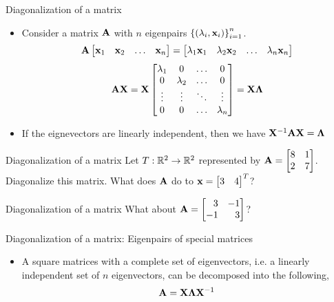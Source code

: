 \documentclass[aspectratio=169]{beamer}
\let\olditem\item
\renewcommand{\item}{\setlength{\itemsep}{\fill}\olditem}
\def\mf{\ensuremath\mathbf}
\def\mb{\ensuremath\mathbb}
\def\bmx{\ensuremath\begin{bmatrix*}[r]}
\def\emx{\ensuremath\end{bmatrix*}}
\begin{document}
\begin{frame}[t]{Diagonalization of a matrix}
\begin{itemize}
    \item Consider a matrix $\mf{A}$ with $n$ eigenpairs $\left\{\left(\lambda_i, \mf{x}_i\right)\right\}_{i=1}^n$.
    \[ \mf{A}\begin{bmatrix*}\mf{x}_1 & \mf{x}_2 & \ldots & \mf{x}_n\end{bmatrix*} = \begin{bmatrix*}\lambda_1\mf{x}_1 & \lambda_2\mf{x}_2 & \ldots & \lambda_n\mf{x}_n\end{bmatrix*} \]
    \[ \mf{AX} = \mf{X}\begin{bmatrix*}\lambda_1 & 0 & \ldots & 0\\0 & \lambda_2 & \ldots & 0\\\vdots & \vdots & \ddots & \vdots\\0 & 0 & \ldots & \lambda_n\end{bmatrix*} = \mf{X}\mf{\Lambda} \]

    \item If the eignevectors are linearly independent, then we have $\mf{X}^{-1}\mf{A}\mf{X} = \mf{\Lambda}$
\end{itemize}
\end{frame}


\begin{frame}[t]{Diagonalization of a matrix}
Let $T: \mb{R}^2 \to \mb{R}^2$ represented by $\mf{A} = \bmx 8 & 1\\2 & 7\emx$. Diagonalize this matrix. What does $\mf{A}$ do to $\mf{x} = \bmx 3 & 4\emx^T$?
\end{frame}


\begin{frame}[t]{Diagonalization of a matrix}
What about $\mf{A} = \bmx 3 & -1\\-1 & 3\emx$?
\end{frame}


\begin{frame}[t]{Diagonalization of a matrix: Eigenpairs of special matrices}
\begin{itemize}
    \item A square matrices with a complete set of eigenvectors, i.e. a linearly independent set of $n$ eigenvectors, can be decomposed into the following,
    \[ \mf{A} = \mf{X}\mf{\Lambda}\mf{X}^{-1} \]
\end{itemize}
\end{frame}
\end{document}
